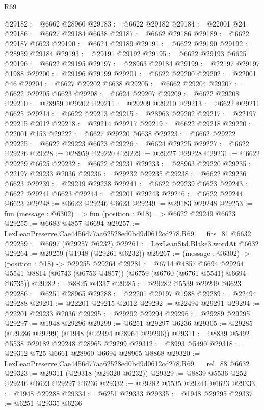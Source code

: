 \begin{lexlean}{R69}
\begin{coremodule}
{@29182 := @6662 @28960
@29183 := @6622 @29182
@29184 := @22001 @24
@29186 := @6627 @29184 @6638
@29187 := @6662 @29186
@29189 := @6622 @29187 @6623
@29190 := @6624 @29189
@29191 := @6622 @29190
@29192 := @28959 @29184
@29193 := @29191 @29192
@29195 := @6622 @29193 @6625
@29196 := @6622 @29195
@29197 := @28963 @29184
@29199 := @22197 @29197 @1988
@29200 := @29196 @29199
@29201 := @6622 @29200
@29202 := @22001 @46
@29204 := @6627 @29202 @6638
@29205 := @6662 @29204
@29207 := @6622 @29205 @6623
@29208 := @6624 @29207
@29209 := @6622 @29208
@29210 := @28959 @29202
@29211 := @29209 @29210
@29213 := @6622 @29211 @6625
@29214 := @6622 @29213
@29215 := @28963 @29202
@29217 := @22197 @29215 @2012
@29218 := @29214 @29217
@29219 := @6622 @29218
@29220 := @22001 @153
@29222 := @6627 @29220 @6638
@29223 := @6662 @29222
@29225 := @6622 @29223 @6623
@29226 := @6624 @29225
@29227 := @6622 @29226
@29228 := @28959 @29220
@29229 := @29227 @29228
@29231 := @6622 @29229 @6625
@29232 := @6622 @29231
@29233 := @28963 @29220
@29235 := @22197 @29233 @2036
@29236 := @29232 @29235
@29238 := @6622 @29236 @6623
@29239 := @29219 @29238
@29241 := @6622 @29239 @6623
@29243 := @6622 @29241 @6623
@29244 := @29201 @29243
@29246 := @6622 @29244 @6623
@29248 := @6622 @29246 @6623
@29249 := @29183 @29248
@29253 := fun (message : @6302) => fun (position : @18) => @6622 @29249 @6623
@29255 := @6683 @4857 @6694
@29257 := LexLeanPreserve.Cae4456d77aa62528ed0bd9d0612cd278.R69.__fits_81 @6632
@29259 := @6697 (@29257 @6232)
@29261 := LexLeanStd.Blake3.wordAt @6632
@29264 := @29259 (@1948 (@29261 @6232))
@29267 := (message : @6302) -> (position : @18) -> @29255 @29264
@29281 := @6714
    @4857
    @6694
    @29264
    @5541
    @8814
    (@6743 (@6753 @4857))
    (@6759 (@6760 (@6761 @5541) @6694 @6735))
@29282 := @8825 @4337
@29285 := @29282 @5539 @29249 @6623
@29286 := @6251 @28965
@29288 := @22201 @29197 @1988
@29289 := @22494 @29288
@29291 := @22201 @29215 @2012
@29292 := @22494 @29291
@29294 := @22201 @29233 @2036
@29295 := @29292 @29294
@29296 := @29289 @29295
@29297 := @1948 @29296
@29299 := @6251 @29297 @6236
@29305 := @29285 (@29286 @29299) (@1948 (@22494 @28964 @29296))
@29311 := @8839 @5492 @5538 @29182 @29248 @28965 @29299
@29312 := @8993 @5490
@29318 := @29312 @725 @6661 @28960 @6694 @28965 @8868
@29320 := LexLeanPreserve.Cae4456d77aa62528ed0bd9d0612cd278.R69.__rel_88 @6632
@29323 := @29311 (@29318 (@29320 @6232))
@29329 := @8839 @5536 @252 @29246 @6623 @29297 @6236
@29332 := @29282 @5535 @29244 @6623
@29333 := @1948 @29288
@29334 := @6251 @29333
@29335 := @1948 @29295
@29337 := @6251 @29335 @6236
}
\end{coremodule}
\end{lexlean}
